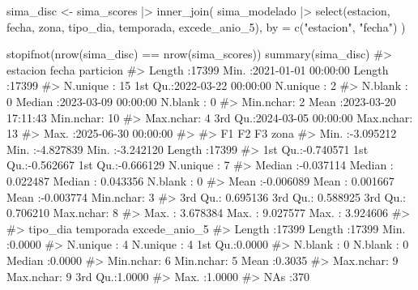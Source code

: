 \documentclass[
  spanish,
  letterpaper,
  DIV=11,
  numbers=noendperiod]{scrartcl}
\newenvironment{Shaded}{\begin{snugshade}}{\end{snugshade}}
\newcommand{\AttributeTok}[1]{\textcolor[rgb]{0.40,0.45,0.13}{#1}}
\newcommand{\CommentTok}[1]{\textcolor[rgb]{0.37,0.37,0.37}{#1}}
\newcommand{\FunctionTok}[1]{\textcolor[rgb]{0.28,0.35,0.67}{#1}}
\newcommand{\NormalTok}[1]{\textcolor[rgb]{0.00,0.23,0.31}{#1}}
\newcommand{\OtherTok}[1]{\textcolor[rgb]{0.00,0.23,0.31}{#1}}
\newcommand{\SpecialCharTok}[1]{\textcolor[rgb]{0.37,0.37,0.37}{#1}}
\newcommand{\StringTok}[1]{\textcolor[rgb]{0.13,0.47,0.30}{#1}}
\begin{document}
\begin{Shaded}
\begin{Highlighting}[]
\NormalTok{sima\_disc }\OtherTok{\textless{}{-}}\NormalTok{ sima\_scores }\SpecialCharTok{|\textgreater{}}
    \FunctionTok{inner\_join}\NormalTok{(}
\NormalTok{        sima\_modelado }\SpecialCharTok{|\textgreater{}}
            \FunctionTok{select}\NormalTok{(estacion, fecha, zona, tipo\_dia, temporada, excede\_anio\_5),}
        \AttributeTok{by =} \FunctionTok{c}\NormalTok{(}\StringTok{"estacion"}\NormalTok{, }\StringTok{"fecha"}\NormalTok{)}
\NormalTok{    )}

\FunctionTok{stopifnot}\NormalTok{(}\FunctionTok{nrow}\NormalTok{(sima\_disc) }\SpecialCharTok{==} \FunctionTok{nrow}\NormalTok{(sima\_scores))}
\FunctionTok{summary}\NormalTok{(sima\_disc)}
\CommentTok{\#\textgreater{}       estacion         fecha                         particion    }
\CommentTok{\#\textgreater{}  Length   :17399   Min.   :2021{-}01{-}01 00:00:00   Length   :17399  }
\CommentTok{\#\textgreater{}  N.unique :   15   1st Qu.:2022{-}03{-}22 00:00:00   N.unique :    2  }
\CommentTok{\#\textgreater{}  N.blank  :    0   Median :2023{-}03{-}09 00:00:00   N.blank  :    0  }
\CommentTok{\#\textgreater{}  Min.nchar:    2   Mean   :2023{-}03{-}20 17:11:43   Min.nchar:   10  }
\CommentTok{\#\textgreater{}  Max.nchar:    4   3rd Qu.:2024{-}03{-}05 00:00:00   Max.nchar:   13  }
\CommentTok{\#\textgreater{}                    Max.   :2025{-}06{-}30 00:00:00                    }
\CommentTok{\#\textgreater{}                                                                   }
\CommentTok{\#\textgreater{}        F1                  F2                  F3                   zona      }
\CommentTok{\#\textgreater{}  Min.   :{-}3.095212   Min.   :{-}4.827839   Min.   :{-}3.242120   Length   :17399  }
\CommentTok{\#\textgreater{}  1st Qu.:{-}0.740571   1st Qu.:{-}0.562667   1st Qu.:{-}0.666129   N.unique :    7  }
\CommentTok{\#\textgreater{}  Median :{-}0.037114   Median : 0.022487   Median : 0.043356   N.blank  :    0  }
\CommentTok{\#\textgreater{}  Mean   :{-}0.006089   Mean   : 0.001667   Mean   :{-}0.003774   Min.nchar:    3  }
\CommentTok{\#\textgreater{}  3rd Qu.: 0.695136   3rd Qu.: 0.588925   3rd Qu.: 0.706210   Max.nchar:    8  }
\CommentTok{\#\textgreater{}  Max.   : 3.678384   Max.   : 9.027577   Max.   : 3.924606                    }
\CommentTok{\#\textgreater{}                                                                               }
\CommentTok{\#\textgreater{}       tipo\_dia         temporada     excede\_anio\_5   }
\CommentTok{\#\textgreater{}  Length   :17399   Length   :17399   Min.   :0.0000  }
\CommentTok{\#\textgreater{}  N.unique :    4   N.unique :    4   1st Qu.:0.0000  }
\CommentTok{\#\textgreater{}  N.blank  :    0   N.blank  :    0   Median :0.0000  }
\CommentTok{\#\textgreater{}  Min.nchar:    6   Min.nchar:    5   Mean   :0.3035  }
\CommentTok{\#\textgreater{}  Max.nchar:    9   Max.nchar:    9   3rd Qu.:1.0000  }
\CommentTok{\#\textgreater{}                                      Max.   :1.0000  }
\CommentTok{\#\textgreater{}                                      NAs    :370}
\end{Highlighting}
\end{Shaded}
\end{document}
